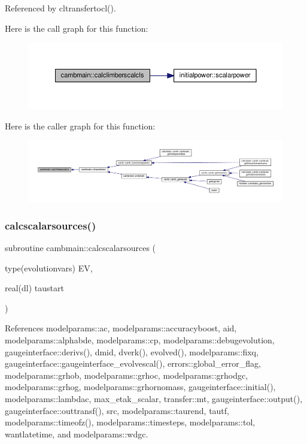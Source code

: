 Referenced by cltransfertocl().

Here is the call graph for this function\+:
\nopagebreak
\begin{figure}[H]
\begin{center}
\leavevmode
\includegraphics[width=350pt]{namespacecambmain_ad3f7f4af84395bc4648bcc82e81e8861_cgraph}
\end{center}
\end{figure}
Here is the caller graph for this function\+:
\nopagebreak
\begin{figure}[H]
\begin{center}
\leavevmode
\includegraphics[width=350pt]{namespacecambmain_ad3f7f4af84395bc4648bcc82e81e8861_icgraph}
\end{center}
\end{figure}
\mbox{\label{namespacecambmain_ab6fa8682eb65308c413e6501a9b5417c}} 
\subsubsection{\texorpdfstring{calcscalarsources()}{calcscalarsources()}}
{\footnotesize\ttfamily subroutine cambmain\+::calcscalarsources (\begin{DoxyParamCaption}\item[{type(evolutionvars)}]{EV,  }\item[{real(dl)}]{taustart }\end{DoxyParamCaption})}



References modelparams\+::ac, modelparams\+::accuracyboost, aid, modelparams\+::alphabde, modelparams\+::cp, modelparams\+::debugevolution, gaugeinterface\+::derivs(), dmid, dverk(), evolved(), modelparams\+::fixq, gaugeinterface\+::gaugeinterface\+\_\+evolvescal(), errors\+::global\+\_\+error\+\_\+flag, modelparams\+::grhob, modelparams\+::grhoc, modelparams\+::grhodgc, modelparams\+::grhog, modelparams\+::grhornomass, gaugeinterface\+::initial(), modelparams\+::lambdac, max\+\_\+etak\+\_\+scalar, transfer\+::mt, gaugeinterface\+::output(), gaugeinterface\+::outtransf(), src, modelparams\+::taurend, tautf, modelparams\+::timeofz(), modelparams\+::timesteps, modelparams\+::tol, wantlatetime, and modelparams\+::wdgc.




